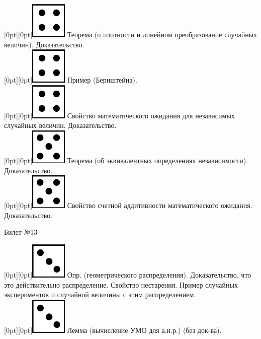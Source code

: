 \documentclass[10pt]{article}
\begin{document}
\raisebox{-1pt}[0pt][0pt]{\includegraphics[width=0.02\linewidth]{4.png}} Теорема (о плотности и линейном преобразование случайных величин). Доказательство. \\

\raisebox{-1pt}[0pt][0pt]{\includegraphics[width=0.02\linewidth]{4.png}}  Пример (Бернштейна). \\

\raisebox{-1pt}[0pt][0pt]{\includegraphics[width=0.02\linewidth]{4.png}} Свойство  математического ожидания для независимых случайных величин. Доказательство. \\

\raisebox{-1pt}[0pt][0pt]{\includegraphics[width=0.02\linewidth]{5.png}} Теорема (об эквивалентных определениях независимости). Доказательство. \\

\raisebox{-1pt}[0pt][0pt]{\includegraphics[width=0.02\linewidth]{5.png}}  Свойство счетной аддитивности математического ожидания. Доказательство. \\

\begin{center} {\Large Билет №13} \end{center} 

\raisebox{-1pt}[0pt][0pt]{\includegraphics[width=0.02\linewidth]{3.png}}  Опр. (геометрического распределения). Доказательство, что это действительно распределение. Свойство нестарения. Пример случайных экспериментов и случайной величины с этим распределением. \\      

\raisebox{-1pt}[0pt][0pt]{\includegraphics[width=0.02\linewidth]{3.png}} Лемма (вычисление УМО для а.н.р.)  (без док-ва). \\
\end{document}
